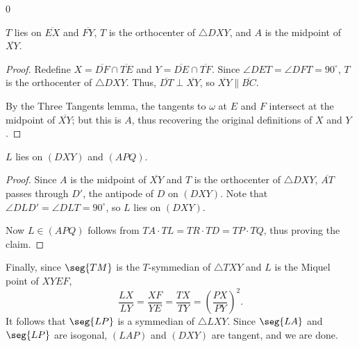 \setcounter{claim}0
\begin{claim}
    $T$ lies on $\overline{EX}$ and $\overline{FY}$, $T$ is the orthocenter of $\triangle DXY$, and $A$ is the midpoint of $\overline{XY}$.
\end{claim}
\begin{proof}
    Redefine $X=\overline{DF}\cap\overline{TE}$ and $Y=\overline{DE}\cap\overline{TF}$. Since $\angle DET=\angle DFT=90^\circ$, $T$ is the orthocenter of $\triangle DXY$. Thus, $\overline{DT}\perp\overline{XY}$, so $\overline{XY}\parallel\overline{BC}$.

    By the Three Tangents lemma, the tangents to $\omega$ at $E$ and $F$ intersect at the midpoint of $\overline{XY}$; but this is $A$, thus recovering the original definitions of $X$ and $Y$.
\end{proof}
\begin{claim}
    $L$ lies on $(DXY)$ and $(APQ)$.
\end{claim}
\begin{proof}
    Since $A$ is the midpoint of $\overline{XY}$ and $T$ is the orthocenter of $\triangle DXY$, $\overline{AT}$ passes through $D'$, the antipode of $D$ on $(DXY)$. Note that $\angle DLD'=\angle DLT=90^\circ$, so $L$ lies on $(DXY)$.

    Now $L\in(APQ)$ follows from $TA\cdot TL=TR\cdot TD=TP\cdot TQ$, thus proving the claim.
\end{proof}

Finally, since $\seg{TM}$ is the $T$-symmedian of $\triangle TXY$ and $L$ is the Miquel point of $XYEF$, \[\frac{LX}{LY}=\frac{XF}{YE}=\frac{TX}{TY}=\left(\frac{PX}{PY}\right)^2.\]
It follows that $\seg{LP}$ is a symmedian of $\triangle LXY$. Since $\seg{LA}$ and $\seg{LP}$ are isogonal, $(LAP)$ and $(DXY)$ are tangent, and we are done.

